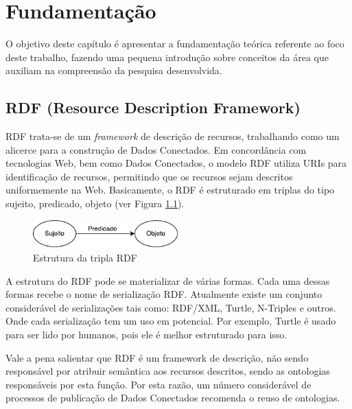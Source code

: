 \chapter{Fundamentação}
\label{cap:fundamentacao}
O objetivo deste capítulo é apresentar a fundamentação teórica referente ao foco deste trabalho, fazendo uma pequena introdução  sobre conceitos da área que auxiliam na compreensão da pesquisa desenvolvida.

\section{RDF (Resource Description Framework)}

RDF trata-se de um \textit{framework} de descrição de recursos, trabalhando como um alicerce para a construção de Dados Conectados. Em concordância com tecnologias Web, bem como Dados Conectados, o modelo RDF utiliza URIs para identificação de recursos, permitindo que os recursos sejam descritos uniformemente na Web. Basicamente, o RDF é estruturado em triplas do tipo sujeito, predicado, objeto (ver Figura \ref{fig:spo}). 

\begin{figure}[!ht]
	\centering
	\includegraphics[width=0.5\textwidth]{./imagens/Sujeito-predicado-objeto.pdf}
    \caption{Estrutura da tripla RDF}
	\label{fig:spo}
\end{figure}

A estrutura do RDF pode se materializar de várias formas. Cada uma dessas formas recebe o nome de serialização RDF. Atualmente existe um conjunto considerável de serializações tais como: RDF/XML, Turtle, N-Triples e outros. Onde cada serialização tem um uso em potencial. Por exemplo, Turtle é usado para ser lido por humanos, pois ele é melhor estruturado para isso. 

Vale a pena salientar que RDF é um framework de descrição, não sendo responsável por atribuir semântica aos recursos descritos, sendo as ontologias responsáveis por esta função. Por esta razão, um número considerável de processos de publicação de Dados Conectados \cite{bizer2007publish, hyland2011joy, villazon2011methodological, Avila2015} recomenda o reuso de ontologias. 

